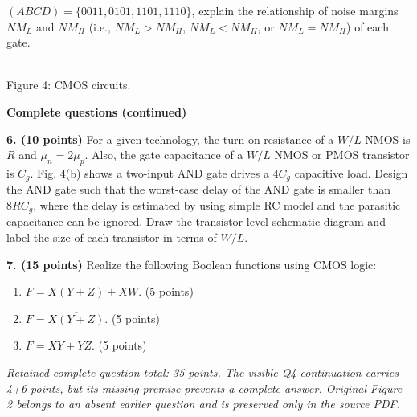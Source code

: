 \documentclass[10pt]{article}
\newcommand{\gnd}[2]{\draw(#1,#2)--(#1,{#2-.12});\draw({#1-.17},{#2-.12})--({#1+.17},{#2-.12});\draw({#1-.11},{#2-.2})--({#1+.11},{#2-.2});}
\begin{document}
$(ABCD)=\{0011,0101,1101,1110\}$, explain the relationship of noise margins $NM_L$ and $NM_H$ (i.e., $NM_L>NM_H$, $NM_L<NM_H$, or $NM_L=NM_H$) of each gate.\begin{center}\\Figure 4: CMOS circuits.\end{center}\newpage
\begin{center}\large\textbf{Complete questions (continued)}\end{center}
\textbf{6. (10 points)} For a given technology, the turn-on resistance of a $W/L$ NMOS is $R$ and $\mu_n=2\mu_p$. Also, the gate capacitance of a $W/L$ NMOS or PMOS transistor is $C_g$. Fig. 4(b) shows a two-input AND gate drives a $4C_g$ capacitive load. Design the AND gate such that the worst-case delay of the AND gate is smaller than $8RC_g$, where the delay is estimated by using simple RC model and the parasitic capacitance can be ignored. Draw the transistor-level schematic diagram and label the size of each transistor in terms of $W/L$.\par\vspace{17mm}\par\textbf{7. (15 points)} Realize the following Boolean functions using CMOS logic:
\begin{enumerate}[label=(\alph*),leftmargin=8mm]
\item $F=X(Y+Z)+XW$. (5 points)
\item $F=\overline{X(Y+Z)}$. (5 points)
\item $F=XY+YZ$. (5 points)
\end{enumerate}\vfill
\textit{Retained complete-question total: 35 points. The visible Q4 continuation carries 4+6 points, but its missing premise prevents a complete answer. Original Figure 2 belongs to an absent earlier question and is preserved only in the source PDF.}
\end{document}
